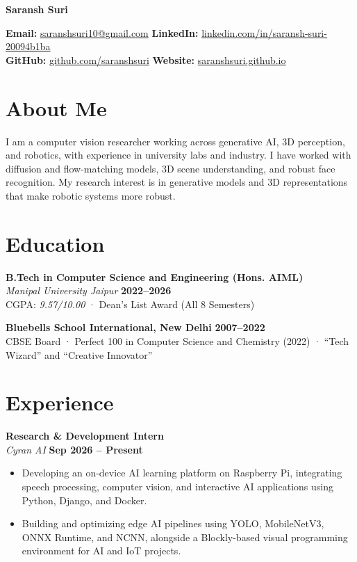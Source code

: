 \documentclass[a4paper,10pt]{article}
\begin{document}
\begin{center}
    \textbf{\Huge Saransh Suri}
\end{center}
\vspace{-0.15em}

\noindent
\textbf{Email:} \href{mailto:saranshsuri10@gmail.com}{saranshsuri10@gmail.com} \hfill
\textbf{LinkedIn:} \href{https://www.linkedin.com/in/saransh-suri-20094b1ba}{linkedin.com/in/saransh-suri-20094b1ba} \\
\textbf{GitHub:} \href{https://github.com/saranshsuri}{github.com/saranshsuri} \hfill
\textbf{Website:} \href{https://saranshsuri.github.io/saransh_suri/}{saranshsuri.github.io}

\section*{About Me}

I am a computer vision researcher working across generative AI, 3D perception, and robotics, with experience in university labs and industry. I have worked with diffusion and flow-matching models, 3D scene understanding, and robust face recognition. My research interest is in generative models and 3D representations that make robotic systems more robust.

\section*{Education}

\textbf{B.Tech in Computer Science and Engineering (Hons. AIML)} \\
\textit{Manipal University Jaipur} \hfill \textbf{2022--2026} \\
CGPA: \textit{9.57/10.00} · Dean's List Award (All 8 Semesters)

\vspace{0.5em}
\noindent
\textbf{Bluebells School International, New Delhi} \hfill \textbf{2007--2022} \\
CBSE Board · Perfect 100 in Computer Science and Chemistry (2022) · ``Tech Wizard'' and ``Creative Innovator''

\section*{Experience}

\noindent\textbf{Research \& Development Intern} \\
\textit{Cyran AI} \hfill \textbf{Sep 2026 -- Present}
\begin{itemize}[label=--]
    \item Developing an on-device AI learning platform on Raspberry Pi, integrating speech processing, computer vision, and interactive AI applications using Python, Django, and Docker.
    \item Building and optimizing edge AI pipelines using YOLO, MobileNetV3, ONNX Runtime, and NCNN, alongside a Blockly-based visual programming environment for AI and IoT projects.
\end{itemize}
\end{document}
